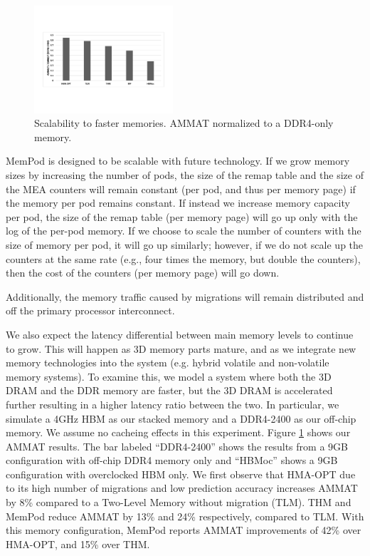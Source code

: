 \begin{figure}
  \includegraphics[width=0.46\textwidth]{figures/scalability.pdf}
  \caption{Scalability to faster memories. AMMAT normalized to a DDR4-only memory.}
  \label{fig:scalability}
\end{figure}

MemPod is designed to be scalable with future technology.  If we grow memory
sizes by increasing the number of pods, the size of the remap table and the 
size of the MEA counters will remain constant (per pod, and thus per memory
page) if the memory per pod remains constant.  If instead we increase
memory capacity per pod, the size of the remap table (per memory page)
will go up only with the log of the per-pod memory. If we choose to scale
the number of counters with the size of memory per pod, it will go up
similarly; however, if we do not scale up the counters at the same rate
(e.g., four times the memory, but double the counters), then the cost
of the counters (per memory page) will go down.

Additionally, the memory traffic caused by migrations will remain distributed
and off the primary processor interconnect.

We also expect the latency differential between main memory levels to 
continue to grow.  This will happen as 3D memory parts mature, and as
we integrate new memory technologies into the system (e.g. hybrid
volatile and non-volatile memory systems).
To examine this, we model a system where both the 3D DRAM and the DDR memory
are faster, but the 3D DRAM is accelerated further resulting in a higher
latency ratio between the two. 
In particular, we simulate a 4GHz HBM as our stacked memory and a DDR4-2400 as our off-chip memory. 
We assume no cacheing effects in this experiment.
Figure \ref{fig:scalability} shows our AMMAT results. The bar labeled ``DDR4-2400'' shows the results from a 9GB configuration with off-chip DDR4 memory only and ``HBMoc'' shows a 9GB configuration with overclocked HBM only. We first observe that HMA-OPT due to its high number of 
migrations and low prediction accuracy increases AMMAT by 8\% compared to a 
Two-Level Memory without migration (TLM). THM and MemPod reduce AMMAT by 13\% and 24\% respectively, compared to TLM. With this memory configuration, MemPod 
reports AMMAT improvements of 42\% over HMA-OPT, and 15\% over THM. 

